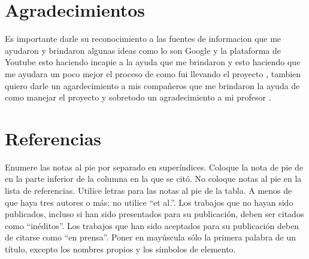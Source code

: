     \section{Agradecimientos}
    
    Es importante darle su reconocimiento a las fuentes de informacion que me ayudaron y brindaron algunas ideas como lo son Google y la plataforma de Youtube esto haciendo incapie a la ayuda que me brindaron y esto haciendo que me ayudara un poco mejor el proceso de como fui llevando el proyecto , tambien quiero darle un agardecimiento a mis compañeros que me brindaron la ayuda de como manejar el proyecto y sobretodo un agradecimiento a mi profesor .
    
    \section*{Referencias}
    
    Enumere las notas al pie por separado en superíndices. Coloque la nota de pie de en la parte inferior de la columna en la que se citó. No coloque notas al pie en la lista de referencias. Utilice letras para las notas al pie de la tabla.
    A menos de que haya tres autores o más; no utilice “et al.”. Los trabajos que no hayan sido publicados, incluso si han sido presentados para su publicación, deben ser citados como “inéditos”. Los trabajos que han sido aceptados para su publicación deben de citarse como “en prensa”. Poner en mayúscula sólo la primera palabra de un título, excepto los nombres propios y los símbolos de elemento. 
    
    
    
